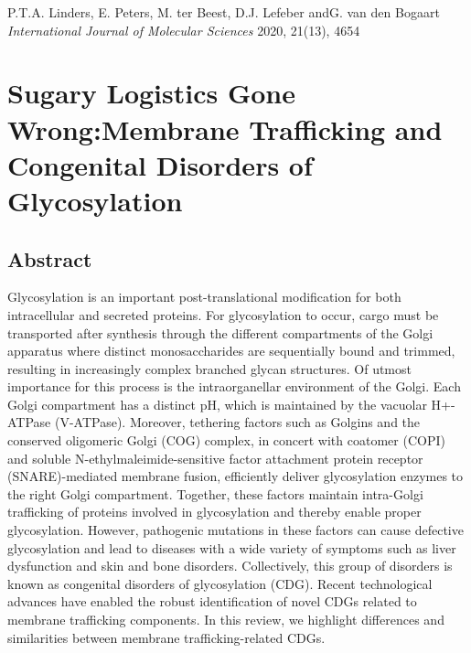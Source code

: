 
\stopthumb


% 


\thispagestyle{empty}
\begin{savequote}
    \normalfont\normalsize{P.T.A. Linders, E. Peters, M. ter Beest, D.J. Lefeber and\newline G. van den  Bogaart\\
        \emph{International Journal of Molecular Sciences} 2020, 21(13), 4654}
\end{savequote}
\chapter{Sugary Logistics Gone Wrong:\newline Membrane Trafficking and Congenital Disorders of Glycosylation}

\thispagestyle{empty}
\clearpage

\continuethumb
\section{Abstract}

Glycosylation is an important post-translational modification for both intracellular and secreted proteins. For glycosylation to occur, cargo must be transported after synthesis through the different compartments of the Golgi apparatus where distinct monosaccharides are sequentially bound and trimmed, resulting in increasingly complex branched glycan structures. Of utmost importance for this process is the intraorganellar environment of the Golgi. Each Golgi compartment has a distinct pH, which is maintained by the vacuolar H+-ATPase (V-ATPase). Moreover, tethering factors such as Golgins and the conserved oligomeric Golgi (COG) complex, in concert with coatomer (COPI) and soluble N-ethylmaleimide-sensitive factor attachment protein receptor (SNARE)-mediated membrane fusion, efficiently deliver glycosylation enzymes to the right Golgi compartment. Together, these factors maintain intra-Golgi trafficking of proteins involved in glycosylation and thereby enable proper glycosylation. However, pathogenic mutations in these factors can cause defective glycosylation and lead to diseases with a wide variety of symptoms such as liver dysfunction and skin and bone disorders. Collectively, this group of disorders is known as congenital disorders of glycosylation (CDG). Recent technological advances have enabled the robust identification of novel CDGs related to membrane trafficking components. In this review, we highlight differences and similarities between membrane trafficking-related CDGs.

